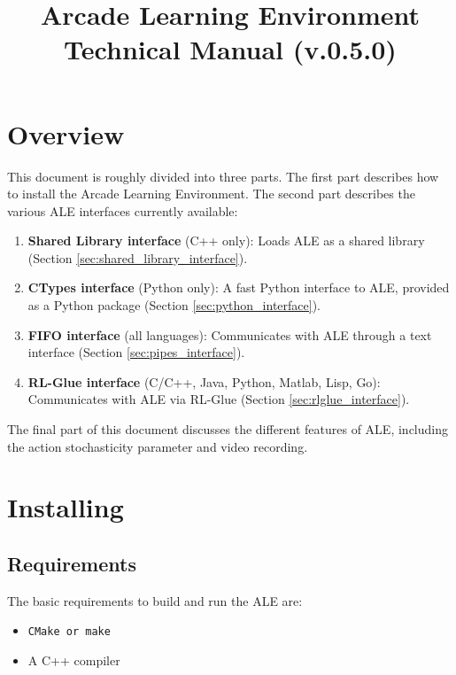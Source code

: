 \documentclass[12pt]{article}
\title{Arcade Learning Environment\\ Technical Manual (v.0.5.0)}
\author{}
\begin{document}
\maketitle

\clearpage

\tableofcontents

\clearpage

\section{Overview}

This document is roughly divided into three parts. The first part describes how to install the Arcade Learning Environment. The second part describes the various ALE interfaces currently available: 
\begin{enumerate}
  \item \textbf{Shared Library interface} (C++ only): Loads ALE as a shared library (Section 
  \ref{sec:shared_library_interface}).
  \item \textbf{CTypes interface} (Python only): A fast Python interface to ALE, provided as a Python package (Section \ref{sec:python_interface}).
  \item \textbf{FIFO interface} (all languages): Communicates with ALE through a text interface (Section \ref{sec:pipes_interface}).
  \item \textbf{RL-Glue interface} (C/C++, Java, Python, Matlab, Lisp, Go): Communicates with ALE via RL-Glue (Section \ref{sec:rlglue_interface}).
\end{enumerate}
The final part of this document discusses the different features of ALE, including the action stochasticity parameter and video recording.

\section{Installing}\label{sec:install}

\subsection{Requirements}

The basic requirements to build and run the ALE are:

\begin{itemize}
  \item \verb+CMake or make+
  \item A C++ compiler
\end{itemize}
\end{document}
